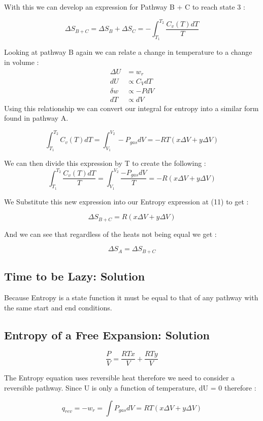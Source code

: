 \documentclass{article}
\newcommand{\be}{\begin{equation}}
\newcommand{\ee}{\end{equation}}
\begin{document}
With this we can develop an expression for 
Pathway B + C to reach state 3 : 

\be
\Delta S_{B+C} = \Delta S_B + \Delta S _C = -\int_{T_1}^{T_2} \frac{ C_v(T)dT}{T}
\ee

Looking at pathway B again we can relate a change in temperature to a change in volume : 
\be
\begin{split}
\Delta U &= w_{r} \\
dU &\propto C_V dT\\
\delta w &\propto -PdV \\ 
dT &\propto dV
\end{split}
\ee
Using this relationship we can convert our integral for entropy into a similar form found in pathway A.

\be
\int_{T_1}^{T_2} { C_v(T)dT} = \int_{V_1}^{V_2} -P_{gas}dV = -RT(x\Delta V + y\Delta V )
\ee

We can then divide this expression by T to create the following : 
\be
\int_{T_1}^{T_2} \frac{ C_v(T)dT}{T} =\int_{V_1}^{V_2} \frac{-P_{gas}dV}{T} = -R (x\Delta V + y\Delta V )
\ee

We Substitute this new expression into our Entropy expression at (11) to get : 

\be
\Delta S_{B+C} = R (x\Delta V + y\Delta V ) 
\ee

And we can see that regardless of the heats not being equal we get : 

\be
\Delta S_{A}= \Delta S_{B+C} 
\ee

\subsection{Time to be Lazy: Solution}

Because Entropy is a state function it must be equal to that of any pathway with the same start and end conditions. 

\subsection{Entropy of a Free Expansion: Solution}

\be
\frac{P}{V}=\frac{RTx}{V}+\frac{RTy}{V}
\ee

The Entropy equation uses reversible heat therefore we need to consider a reversible pathway. 
Since U is only a function of temperature, dU = 0 therefore : 

\be
q_{rev}=-w_{r}= \int P_{gas}dV = RT(x\Delta V + y\Delta V) 
\ee
\end{document}

